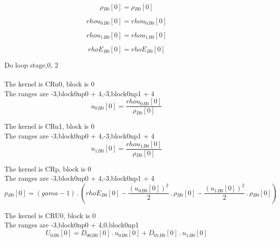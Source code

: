 \documentclass{article}
\begin{document}
\begin{dmath}{\rho{_{B0}}}[{0}] = {\rho{_{B0}}}[{0}]\end{dmath}

\begin{dmath}{rhou_{0}{_{B0}}}[{0}] = {rhou_{0}{_{B0}}}[{0}]\end{dmath}

\begin{dmath}{rhou_{1}{_{B0}}}[{0}] = {rhou_{1}{_{B0}}}[{0}]\end{dmath}

\begin{dmath}{rhoE{_{B0}}}[{0}] = {rhoE{_{B0}}}[{0}]\end{dmath}

\noindent Do loop stage,0, 2\\
\\\noindent The kernel is CRu0, block is 0\\\noindent The ranges are -3,block0np0 + 4,-3,block0np1 + 4\\\begin{dmath}{u_{0}{_{B0}}}[{0}] = \frac{{rhou_{0}{_{B0}}}[{0}]}{{\rho{_{B0}}}[{0}]}\end{dmath}

\noindent The kernel is CRu1, block is 0\\\noindent The ranges are -3,block0np0 + 4,-3,block0np1 + 4\\\begin{dmath}{u_{1}{_{B0}}}[{0}] = \frac{{rhou_{1}{_{B0}}}[{0}]}{{\rho{_{B0}}}[{0}]}\end{dmath}

\noindent The kernel is CRp, block is 0\\\noindent The ranges are -3,block0np0 + 4,-3,block0np1 + 4\\\begin{dmath}{p{_{B0}}}[{0}] = \left(gama - 1\right) \,.\, \left({rhoE{_{B0}}}[{0}] - \frac{\left({u_{0}{_{B0}}}[{0}] \right)^{2}}{2} \,.\, {\rho{_{B0}}}[{0}] - \frac{\left({u_{1}{_{B0}}}[{0}] \right)^{2}}{2} \,.\, 
{\rho{_{B0}}}[{0}]\right)\end{dmath}

\noindent The kernel is CRU0, block is 0\\\noindent The ranges are -3,block0np0 + 4,0,block0np1\\\begin{dmath}{U_{0}{_{B0}}}[{0}] = {D_{00}{_{B0}}}[{0}] \,.\, {u_{0}{_{B0}}}[{0}] + {D_{01}{_{B0}}}[{0}] \,.\, {u_{1}{_{B0}}}[{0}]\end{dmath}
\end{document}
